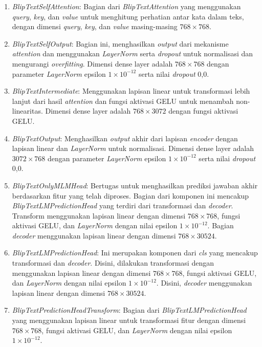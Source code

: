 \begin{enumerate}
  \item \textit{BlipTextSelfAttention}: Bagian dari \textit{BlipTextAttention} yang menggunakan \textit{query}, \textit{key}, dan \textit{value} untuk menghitung perhatian antar kata dalam teks, dengan dimensi \textit{query}, \textit{key}, dan \textit{value} masing-masing $768 \times 768$.

  \item \textit{BlipTextSelfOutput}: Bagian ini, menghasilkan \textit{output} dari mekanisme \textit{attention} dan menggunakan \textit{LayerNorm} serta \textit{dropout} untuk normalisasi dan mengurangi \textit{overfitting}. Dimensi dense layer adalah $768 \times 768$ dengan parameter \textit{LayerNorm} epsilon $1 \times 10^{-12}$ serta nilai \textit{dropout} 0,0.

  \item \textit{BlipTextIntermediate}: Menggunakan lapisan linear untuk transformasi lebih lanjut dari hasil \textit{attention} dan fungsi aktivasi GELU untuk menambah non-linearitas. Dimensi dense layer adalah $768 \times 3072$ dengan fungsi aktivasi GELU.

  \item \textit{BlipTextOutput}: Menghasilkan \textit{output} akhir dari lapisan \textit{encoder} dengan lapisan linear dan \textit{LayerNorm} untuk normalisasi. Dimensi dense layer adalah $3072 \times 768$ dengan parameter \textit{LayerNorm} epsilon $1 \times 10^{-12}$ serta nilai \textit{dropout} 0,0.

  \item \textit{BlipTextOnlyMLMHead}: Bertugas untuk menghasilkan prediksi jawaban akhir berdasarkan fitur yang telah diproses. Bagian dari komponen ini mencakup \textit{BlipTextLMPredictionHead} yang terdiri dari transformasi dan \textit{decoder}. Transform menggunakan lapisan linear dengan dimensi $768 \times 768$, fungsi aktivasi GELU, dan \textit{LayerNorm} dengan nilai epsilon $1 \times 10^{-12}$. Bagian \textit{decoder} menggunakan lapisan linear dengan dimensi $768 \times 30524$.

  \item \textit{BlipTextLMPredictionHead}: Ini merupakan komponen dari \textit{cls} yang mencakup transformasi dan \textit{decoder}. Disini, dilakukan transformasi dengan menggunakan lapisan linear dengan dimensi $768 \times 768$, fungsi aktivasi GELU, dan \textit{LayerNorm} dengan nilai epsilon $1 \times 10^{-12}$. Disini, \textit{decoder} menggunakan lapisan linear dengan dimensi $768 \times 30524$.

  \item \textit{BlipTextPredictionHeadTransform}: Bagian dari \textit{BlipTextLMPredictionHead} yang menggunakan lapisan linear untuk transformasi fitur dengan dimensi $768 \times 768$, fungsi aktivasi GELU, dan \textit{LayerNorm} dengan nilai epsilon $1 \times 10^{-12}$.

\end{enumerate}

